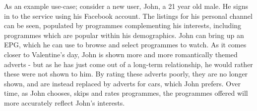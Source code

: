 As an example use-case; consider a new user, John, a 21 year old male. He signs in to the service using his Facebook account. The listings for his personal channel can be seen, populated by programmes complementing his interests, including programmes which are popular within his demographics. John can bring up an EPG, which he can use to browse and select programmes to watch. As it comes closer to Valentine's day, John is shown more and more romantically themed adverts - but as he has just come out of a long-term relationship, he would rather these were not shown to him. By rating these adverts poorly, they are no longer shown, and are instead replaced by adverts for cars, which John prefers. Over time, as John chooses, skips and rates programmes, the programmes offered will more accurately reflect John's interests. 
